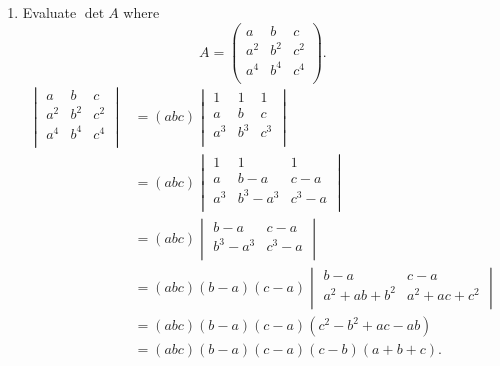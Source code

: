 \begin{example}
\begin{enumerate}
        \item Evaluate $\det{A}$ where
        \[
            A=
            \begin{pmatrix}
                a&b&c\\
                a^2&b^2&c^2\\
                a^4&b^4&c^4\\
            \end{pmatrix}
            .
        \]
        \begin{align*}
            \begin{vmatrix}
                a&b&c\\
                a^2&b^2&c^2\\
                a^4&b^4&c^4\\
            \end{vmatrix}
            &=(abc)
            \begin{vmatrix}
                1&1&1\\
                a&b&c\\
                a^3&b^3&c^3\\
            \end{vmatrix}\\
            &=(abc)
            \begin{vmatrix}
                1&1&1\\
                a&b-a&c-a\\
                a^3&b^3-a^3&c^3-a\\
            \end{vmatrix}\\
            &=(abc)
            \begin{vmatrix}
                b-a&c-a\\
                b^3-a^3&c^3-a\\
            \end{vmatrix}\\
            &=(abc)(b-a)(c-a)
            \begin{vmatrix}
                b-a&c-a\\
                a^2+ab+b^2&a^2+ac+c^2\\
            \end{vmatrix}\\\
            &=(abc)(b-a)(c-a)(c^2-b^2+ac-ab)\\
            &=(abc)(b-a)(c-a)(c-b)(a+b+c).
        \end{align*}
    \end{enumerate}
\end{example}

